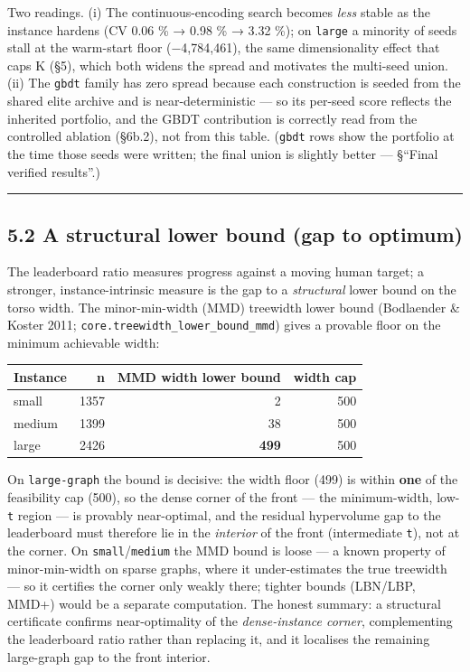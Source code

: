\documentclass[
  11pt,
]{article}
\begin{document}
Two readings. (i) The continuous-encoding search becomes \emph{less}
stable as the instance hardens (CV 0.06 \% → 0.98 \% → 3.32 \%); on
\texttt{large} a minority of seeds stall at the warm-start floor
(−4,784,461), the same dimensionality effect that caps K (§5), which
both widens the spread and motivates the multi-seed union. (ii) The
\texttt{gbdt} family has zero spread because each construction is seeded
from the shared elite archive and is near-deterministic --- so its
per-seed score reflects the inherited portfolio, and the GBDT
contribution is correctly read from the controlled ablation (§6b.2), not
from this table. (\texttt{gbdt} rows show the portfolio at the time
those seeds were written; the final union is slightly better ---
§``Final verified results''.)

\begin{center}\rule{0.5\linewidth}{0.5pt}\end{center}

\hypertarget{a-structural-lower-bound-gap-to-optimum}{%
\subsection{5.2 A structural lower bound (gap to
optimum)}\label{a-structural-lower-bound-gap-to-optimum}}

The leaderboard ratio measures progress against a moving human target; a
stronger, instance-intrinsic measure is the gap to a \emph{structural}
lower bound on the torso width. The minor-min-width (MMD) treewidth
lower bound (Bodlaender \& Koster 2011;
\texttt{core.treewidth\_lower\_bound\_mmd}) gives a provable floor on
the minimum achievable width:

\begin{longtable}[]{@{}lrrr@{}}
\toprule
Instance & n & MMD width lower bound & width cap\tabularnewline
\midrule
\endhead
small & 1357 & 2 & 500\tabularnewline
medium & 1399 & 38 & 500\tabularnewline
large & 2426 & \textbf{499} & 500\tabularnewline
\bottomrule
\end{longtable}

On \texttt{large-graph} the bound is decisive: the width floor (499) is
within \textbf{one} of the feasibility cap (500), so the dense corner of
the front --- the minimum-width, low-\texttt{t} region --- is provably
near-optimal, and the residual hypervolume gap to the leaderboard must
therefore lie in the \emph{interior} of the front (intermediate
\texttt{t}), not at the corner. On \texttt{small}/\texttt{medium} the
MMD bound is loose --- a known property of minor-min-width on sparse
graphs, where it under-estimates the true treewidth --- so it certifies
the corner only weakly there; tighter bounds (LBN/LBP, MMD+) would be a
separate computation. The honest summary: a structural certificate
confirms near-optimality of the \emph{dense-instance corner},
complementing the leaderboard ratio rather than replacing it, and it
localises the remaining large-graph gap to the front interior.
\end{document}
